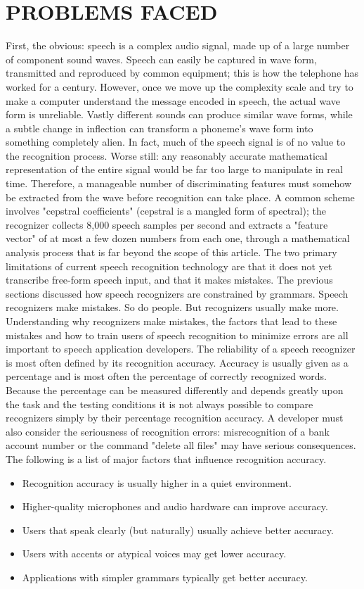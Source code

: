 \documentclass[12pt]{report} %
\begin{document}
\section{PROBLEMS FACED}
\label{sec:PROBLEMS FACED}
First, the obvious: speech is a complex audio signal, made up of a large number of
component sound waves. Speech can easily be captured in wave form, transmitted and
reproduced by common equipment; this is how the telephone has worked for a century.
However, once we move up the complexity scale and try to make a computer understand
the message encoded in speech, the actual wave form is unreliable. Vastly different
sounds can produce similar wave forms, while a subtle change in inflection can transform
a phoneme's wave form into something completely alien. In fact, much of the speech
signal is of no value to the recognition process. Worse still: any reasonably accurate
mathematical representation of the entire signal would be far too large to manipulate in
real time.
Therefore, a manageable number of discriminating features must somehow be extracted
from the wave before recognition can take place. A common scheme involves "cepstral
coefficients" (cepstral is a mangled form of spectral); the recognizer collects 8,000
speech samples per second and extracts a "feature vector" of at most a few dozen
numbers from each one, through a mathematical analysis process that is far beyond the
scope of this article.
The two primary limitations of current speech recognition technology are that it does not
yet transcribe free-form speech input, and that it makes mistakes. The previous sections
discussed how speech recognizers are constrained by grammars. Speech recognizers
make mistakes. So do people. But recognizers usually make more. Understanding why
recognizers make mistakes, the factors that lead to these mistakes and how to train users
of speech recognition to minimize errors are all important to speech application
developers.
The reliability of a speech recognizer is most often defined by its recognition accuracy.
Accuracy is usually given as a percentage and is most often the percentage of correctly
recognized words. Because the percentage can be measured differently and depends
greatly upon the task and the testing conditions it is not always possible to compare
recognizers simply by their percentage recognition accuracy. A developer must also
consider the seriousness of recognition errors: misrecognition of a bank account number
or the command "delete all files" may have serious consequences. The following is a list
of major factors that influence recognition accuracy.
\begin{itemize}
	\item Recognition accuracy is usually higher in a quiet environment.
	\item Higher-quality microphones and audio hardware can improve accuracy.
	\item Users that speak clearly (but naturally) usually achieve better accuracy.
	\item Users with accents or atypical voices may get lower accuracy.
	\item Applications with simpler grammars typically get better accuracy.
\end{itemize}
\end{document}
